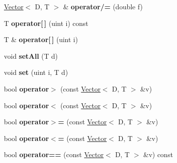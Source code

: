 \begin{DoxyCompactItemize}
\item 
\hypertarget{classutk_1_1Vector_a7051861964e2082701faab81b68534e1}{\hyperlink{classutk_1_1Vector}{Vector}$<$ D, T $>$ \& {\bfseries operator/=} (double f)}\label{classutk_1_1Vector_a7051861964e2082701faab81b68534e1}

\item 
\hypertarget{classutk_1_1Vector_abf49cd7c3a7be2631cdd7c3cf9647f13}{T {\bfseries operator\mbox{[}$\,$\mbox{]}} (uint i) const }\label{classutk_1_1Vector_abf49cd7c3a7be2631cdd7c3cf9647f13}

\item 
\hypertarget{classutk_1_1Vector_ac159eb83f7b44815bbe50c52441ca89b}{T \& {\bfseries operator\mbox{[}$\,$\mbox{]}} (uint i)}\label{classutk_1_1Vector_ac159eb83f7b44815bbe50c52441ca89b}

\item 
\hypertarget{classutk_1_1Vector_a1f72121da7293960e0148ec634e5f811}{void {\bfseries set\-All} (T d)}\label{classutk_1_1Vector_a1f72121da7293960e0148ec634e5f811}

\item 
\hypertarget{classutk_1_1Vector_acbbbec5d3c3515733354304774d1abe3}{void {\bfseries set} (uint i, T d)}\label{classutk_1_1Vector_acbbbec5d3c3515733354304774d1abe3}

\item 
\hypertarget{classutk_1_1Vector_aaca32a1fc634b1cf97020e7f7d02b315}{bool {\bfseries operator$>$} (const \hyperlink{classutk_1_1Vector}{Vector}$<$ D, T $>$ \&v)}\label{classutk_1_1Vector_aaca32a1fc634b1cf97020e7f7d02b315}

\item 
\hypertarget{classutk_1_1Vector_ade3523340d345bab3c167fbc7f65694f}{bool {\bfseries operator$<$} (const \hyperlink{classutk_1_1Vector}{Vector}$<$ D, T $>$ \&v)}\label{classutk_1_1Vector_ade3523340d345bab3c167fbc7f65694f}

\item 
\hypertarget{classutk_1_1Vector_aa442c06f51432af64ade91d99911a43e}{bool {\bfseries operator$>$=} (const \hyperlink{classutk_1_1Vector}{Vector}$<$ D, T $>$ \&v)}\label{classutk_1_1Vector_aa442c06f51432af64ade91d99911a43e}

\item 
\hypertarget{classutk_1_1Vector_a1410ccfeecd43e0217f5ada6dcbad7be}{bool {\bfseries operator$<$=} (const \hyperlink{classutk_1_1Vector}{Vector}$<$ D, T $>$ \&v)}\label{classutk_1_1Vector_a1410ccfeecd43e0217f5ada6dcbad7be}

\item 
\hypertarget{classutk_1_1Vector_a8b1b3c2370ace9d7ff262af5e5eeece7}{bool {\bfseries operator==} (const \hyperlink{classutk_1_1Vector}{Vector}$<$ D, T $>$ \&v) const }\label{classutk_1_1Vector_a8b1b3c2370ace9d7ff262af5e5eeece7}


\end{DoxyCompactItemize}
